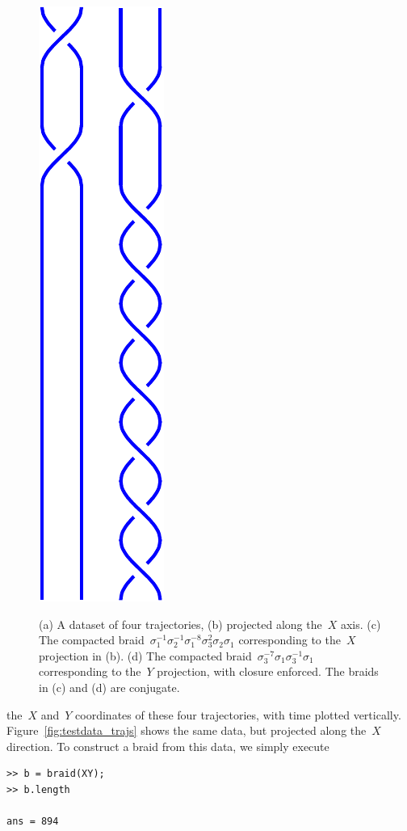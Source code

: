\documentclass[12pt]{article}
\begin{document}
\begin{figure}
\begin{center}
{  \includegraphics[height=.3\textheight]{testdata_braidY}
  \label{fig:testdata_braidY}
}
\end{center}
\caption{(a) A dataset of four trajectories, (b) projected along
  the~$X$ axis.  (c) The compacted braid~$ \sigma_1^{-1} \sigma_2^{-1}
  \sigma_1^{-8}\sigma_3^2\sigma_2\sigma_1$ corresponding to the~$X$
  projection in (b).  (d) The compacted
  braid~$\sigma_3^{-7}\sigma_1\sigma_3^{-1}\sigma_1$ corresponding to
  the~$Y$ projection, with closure enforced.  The braids in (c) and
  (d) are conjugate.}
\end{figure}
%
the~$X$ and~$Y$ coordinates of these four trajectories, with time
plotted vertically.  Figure~\ref{fig:testdata_trajs} shows the same
data, but projected along the~$X$ direction.  To construct a braid
from this data, we simply execute
\begin{lstlisting}[frame=single,framerule=0pt]
>> b = braid(XY);
>> b.length

ans = 894
\end{lstlisting}
\end{document}
